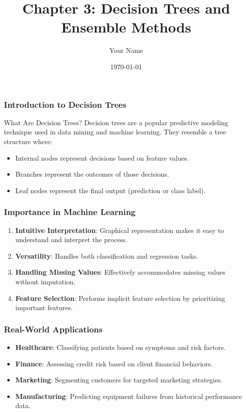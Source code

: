 \documentclass{beamer}
\title{Chapter 3: Decision Trees and Ensemble Methods}
\author{Your Name}
\institute{Your Institution}
\date{\today}
\begin{document}
\frame{\titlepage}

\begin{frame}[fragile]
    \frametitle{Introduction to Decision Trees}
    \begin{block}{What Are Decision Trees?}
        Decision trees are a popular predictive modeling technique used in data mining and machine learning.
        They resemble a tree structure where:
        \begin{itemize}
            \item Internal nodes represent decisions based on feature values.
            \item Branches represent the outcomes of those decisions.
            \item Leaf nodes represent the final output (prediction or class label).
        \end{itemize}
    \end{block}
\end{frame}

\begin{frame}[fragile]
    \frametitle{Importance in Machine Learning}
    \begin{enumerate}
        \item \textbf{Intuitive Interpretation}: Graphical representation makes it easy to understand and interpret the process.
        \item \textbf{Versatility}: Handles both classification and regression tasks.
        \item \textbf{Handling Missing Values}: Effectively accommodates missing values without imputation.
        \item \textbf{Feature Selection}: Performs implicit feature selection by prioritizing important features.
    \end{enumerate}
\end{frame}

\begin{frame}[fragile]
    \frametitle{Real-World Applications}
    \begin{itemize}
        \item \textbf{Healthcare}: Classifying patients based on symptoms and risk factors.
        \item \textbf{Finance}: Assessing credit risk based on client financial behaviors.
        \item \textbf{Marketing}: Segmenting customers for targeted marketing strategies.
        \item \textbf{Manufacturing}: Predicting equipment failures from historical performance data.
    \end{itemize}
\end{frame}
\end{document}
